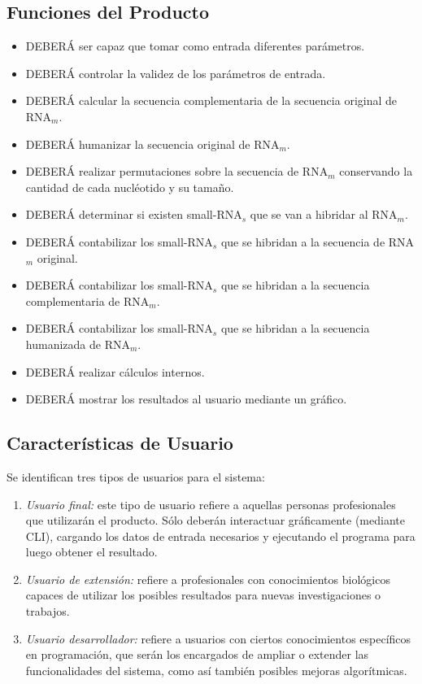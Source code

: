 \documentclass[12pt,a4paper,spanish]{article}
\begin{document}
\subsection{Funciones del Producto}
	\begin{itemize}
		\item DEBERÁ ser capaz que tomar como entrada diferentes parámetros. 
		\item DEBERÁ controlar la validez de los parámetros de entrada. %
		\item DEBERÁ calcular la secuencia complementaria de la secuencia original de RNA$_m$.
		\item DEBERÁ humanizar la secuencia original de RNA$_m$.
		\item DEBERÁ realizar permutaciones sobre la secuencia de RNA$_m$ conservando la cantidad de cada nucléotido y su tamaño.
		\item DEBERÁ determinar si existen small-RNA$_s$ que se van a hibridar al RNA$_m$.
		\item DEBERÁ contabilizar los small-RNA$_s$ que se hibridan a la secuencia de RNA$_m$ original.
		\item DEBERÁ contabilizar los small-RNA$_s$ que se hibridan a la secuencia complementaria de RNA$_m$.
		\item DEBERÁ contabilizar los small-RNA$_s$ que se hibridan a la secuencia humanizada de RNA$_m$.
		\item DEBERÁ realizar cálculos internos.
		\item DEBERÁ mostrar los resultados al usuario mediante un gráfico.		
	\end{itemize}

\subsection{Características de Usuario}
	Se identifican tres tipos de usuarios para el sistema:
	\begin{enumerate}
 		\item \textit{Usuario final:} este tipo de usuario refiere a aquellas personas profesionales que utilizarán el 										producto. Sólo deberán interactuar gráficamente (mediante CLI), cargando los datos de entrada 										necesarios y ejecutando el programa para luego obtener el resultado. 
		\item \textit{Usuario de extensión:} refiere a profesionales con conocimientos biológicos capaces de utilizar los 												posibles resultados para nuevas investigaciones o trabajos.
		\item \textit{Usuario desarrollador:} refiere a usuarios con ciertos conocimientos específicos en programación, 											que serán los encargados de ampliar o extender las funcionalidades del 												sistema, como así también posibles mejoras algorítmicas.
	\end{enumerate}
\end{document}
